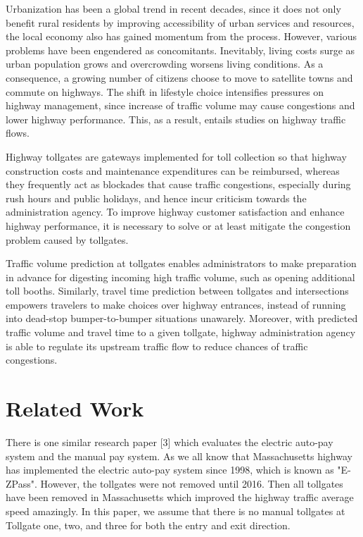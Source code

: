 \documentclass[journal, letterpaper]{IEEEtran}
\begin{document}
Urbanization has been a global trend in recent decades, since it does not only benefit rural residents by improving accessibility of urban services and resources, the local economy also has gained momentum from the process. However, various problems have been engendered as concomitants. Inevitably, living costs surge as urban population grows and overcrowding worsens living conditions. As a consequence, a growing number of citizens choose to move to satellite towns and commute on highways. The shift in lifestyle choice intensifies pressures on highway management, since increase of traffic volume may cause congestions and lower highway performance. This, as a result, entails studies on highway traffic flows.

Highway tollgates are gateways implemented for toll collection so that highway construction costs and maintenance expenditures can be reimbursed, whereas they frequently act as blockades that cause traffic congestions, especially during rush hours and public holidays, and hence incur criticism towards the administration agency. To improve highway customer satisfaction and enhance highway performance, it is necessary to solve or at least mitigate the congestion problem caused by tollgates.  

Traffic volume prediction at tollgates enables administrators to make preparation in advance for digesting incoming high traffic volume, such as opening additional toll booths. Similarly, travel time prediction between tollgates and intersections empowers travelers to make choices over highway entrances, instead of running into dead-stop bumper-to-bumper situations unawarely. Moreover, with predicted traffic volume and travel time to a given tollgate, highway administration agency is able to regulate its upstream traffic flow to reduce chances of traffic congestions.

\section{Related Work}
\large
There is one similar research paper [3] which evaluates the electric auto-pay system and the manual pay system. As we all know that Massachusetts highway has implemented the electric auto-pay system since 1998, which is known as "E-ZPass". However, the tollgates were not removed until 2016. Then all tollgates have been removed in Massachusetts which improved the highway traffic average speed amazingly. In this paper, we assume that there is no manual tollgates at Tollgate one, two, and three for both the entry and exit direction. 
\end{document}
